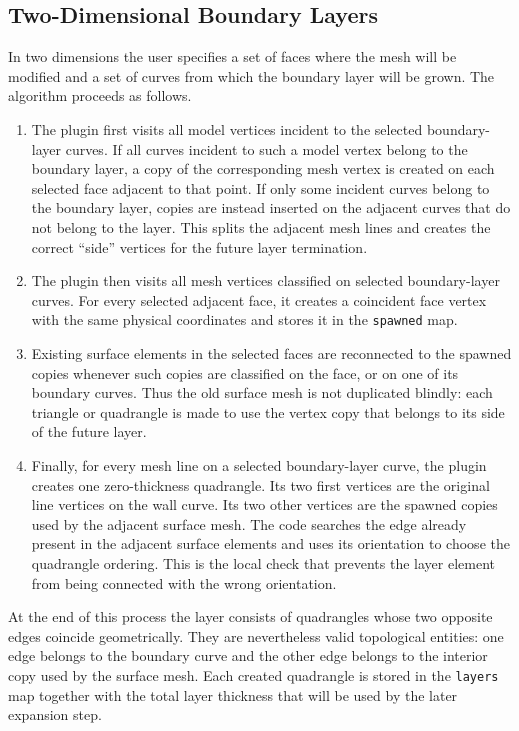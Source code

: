 \documentclass[11pt]{article}
\begin{document}
\subsection{Two-Dimensional Boundary Layers}

In two dimensions the user specifies a set of faces where the mesh will be
modified and a set of curves from which the boundary layer will be grown. The
algorithm proceeds as follows.

\begin{enumerate}
  \item The plugin first visits all model vertices incident to the selected
  boundary-layer curves. If all curves incident to such a model vertex belong to
  the boundary layer, a copy of the corresponding mesh vertex is created on each
  selected face adjacent to that point. If only some incident curves belong to
  the boundary layer, copies are instead inserted on the adjacent curves that do
  not belong to the layer. This splits the adjacent mesh lines and creates the
  correct ``side'' vertices for the future layer termination.

  \item The plugin then visits all mesh vertices classified on selected
  boundary-layer curves. For every selected adjacent face, it creates a
  coincident face vertex with the same physical coordinates and stores it in the
  \texttt{spawned} map.

  \item Existing surface elements in the selected faces are reconnected to the
  spawned copies whenever such copies are classified on the face, or on one of
  its boundary curves. Thus the old surface mesh is not duplicated blindly: each
  triangle or quadrangle is made to use the vertex copy that belongs to its side
  of the future layer.

  \item Finally, for every mesh line on a selected boundary-layer curve, the
  plugin creates one zero-thickness quadrangle. Its two first vertices are the
  original line vertices on the wall curve. Its two other vertices are the
  spawned copies used by the adjacent surface mesh. The code searches the edge
  already present in the adjacent surface elements and uses its orientation to
  choose the quadrangle ordering. This is the local check that prevents the
  layer element from being connected with the wrong orientation.
\end{enumerate}

At the end of this process the layer consists of quadrangles whose two opposite
edges coincide geometrically. They are nevertheless valid topological entities:
one edge belongs to the boundary curve and the other edge belongs to the
interior copy used by the surface mesh. Each created quadrangle is stored in the
\texttt{layers} map together with the total layer thickness that will be used by
the later expansion step.
\end{document}
